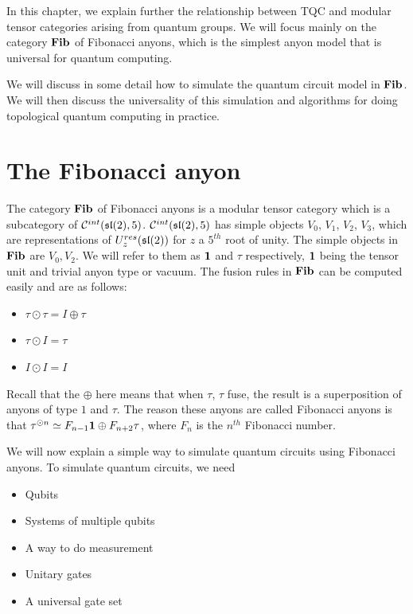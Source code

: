 In this chapter, we explain further the relationship between TQC and modular tensor
categories arising from quantum groups. We will focus mainly on the category
$\mathbf{Fib}$ of Fibonacci anyons, which is the simplest anyon model that is universal for
quantum computing. 

We will discuss in some detail how to simulate the quantum
circuit model in $\mathbf{Fib}$. We will then discuss the universality of this
simulation and algorithms for doing topological quantum computing in practice.

\section{The Fibonacci anyon}
The category $\mathbf{Fib}$ of Fibonacci anyons is a modular tensor category which is a
subcategory of $\mathcal{C}^{int}(\mathfrak{sl}(2),5)$. $\mathcal{C}^{int}(\mathfrak{sl}(2),5)$
has simple objects $V_0$, $V_1$, $V_2$, $V_3$, which are representations of
$U_z^{res}(\mathfrak{sl}(2))$ for $z$ a $5^{th}$ root of unity. The simple objects in 
$\mathbf{Fib}$ are $V_0, V_2$. We will refer to them as $\mathbf{1}$ and $\tau$
respectively, $\mathbf{1}$ being the tensor unit and trivial anyon type or vacuum. The
fusion rules in $\mathbf{Fib}$ can be computed easily and are as follows:

\begin{itemize}
\renewcommand{\labelitemi}{$\bullet$}
    \item $\tau \odot \tau = I \oplus \tau$
    \item $\tau \odot I = \tau$
    \item $I \odot I = I$
\end{itemize}

Recall that the $\oplus$ here means that when $\tau$, $\tau$ fuse, the result
is a superposition of anyons of type $1$ and $\tau$.  The reason these anyons are
called Fibonacci anyons is that $\tau^{\odot n} \simeq F_{n-1} \mathbf{1} \oplus F_{n+2}
\tau$, where $F_n$ is the $n^{th}$ Fibonacci number.

We will now explain a simple way to simulate quantum circuits using Fibonacci
anyons. To simulate quantum circuits, we need

\begin{itemize}
\item Qubits
\item Systems of multiple qubits
\item A way to do measurement
\item Unitary gates
\item A universal gate set
\end{itemize}

